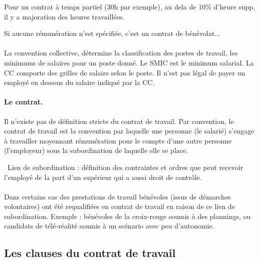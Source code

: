	Pour un contrat à temps partiel (30h par exemple), au dela de 10\% d’heure supp, il y a majoration des heures travaillées.

	Si aucune rémunération n'est spécifiée, c’est un contrat de bénévolat...

	\paragraph{}
	La convention collective, détermine la classification des postes de travail, les minimums de salaires pour un poste donné.
	Le SMIC est le minimum salarial.
	La CC comporte des grilles de salaire selon le poste.
	Il n’est pas légal de payer un employé en dessous du salaire indiqué par la CC.

	\paragraph{Le contrat.}
	Il n’existe pas de définition stricte du contrat de travail.
	Par convention, le contrat de travail est la convention par laquelle une personne (le salarié) s’engage à travailler moyennant rémunération pour le compte d’une autre personne (l’employeur) sous la subordination de laquelle elle se place.

	\textrightarrow\ Lien de subordination : définition des contraintes et ordres que peut recevoir l’employé de la part d’un supérieur qui a aussi droit de contrôle.

	\paragraph{}
	Dans certains cas des prestations de travail bénévoles (issus de démarches volontaires) ont été requalifiées en contrat de travail en raison de ce lien de subordination.
	Exemple : bénévoles de la croix-rouge soumis à des plannings, ou candidats de télé-réalité soumis à un scénario avec peu d'autonomie.

\subsection{Les clauses du contrat de travail}

